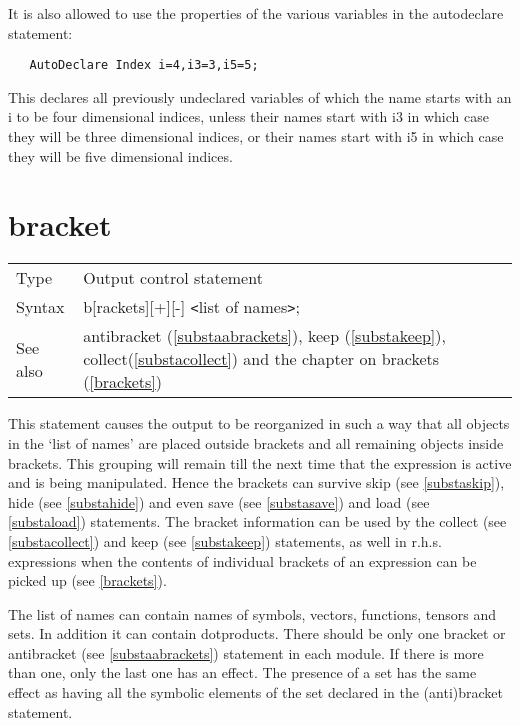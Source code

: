 \noindent It is also allowed to use the properties of the various variables 
in the autodeclare statement:
\begin{verbatim}
   AutoDeclare Index i=4,i3=3,i5=5;
\end{verbatim}
This declares all previously undeclared variables of which the name starts 
with an i to be four dimensional indices, unless their names start with i3 in 
which case they will be three dimensional indices, or their names start 
with i5 in which case they will be five dimensional indices. \vspace{10mm}


\section{bracket}
\label{substabracket}

\noindent \begin{tabular}{ll}
Type & Output control statement\\
Syntax & b[rackets][+][-] {\tt<}list of names{\tt>}; \\
See also & antibracket (\ref{substaabrackets}), keep (\ref{substakeep}),
    collect(\ref{substacollect}) and the chapter on brackets 
     (\ref{brackets})
\end{tabular} \vspace{4mm}

\noindent This statement causes the output to be reorganized in such a way 
that all objects in the `list of names' are placed outside 
brackets and all remaining objects inside 
brackets. This grouping will remain till the next time that 
the expression is active and is being manipulated. Hence the brackets can 
survive skip (see \ref{substaskip}), hide (see \ref{substahide}) and even 
save (see \ref{substasave}) and load (see \ref{substaload}) statements. The 
bracket information can be used by the collect (see \ref{substacollect}) 
and keep (see \ref{substakeep}) statements, as well in r.h.s. expressions 
when the contents of individual brackets of an expression can be picked up 
(see \ref{brackets}). \vspace{4mm}

\noindent The list of names can contain names of symbols, vectors, 
functions, tensors and sets. In addition it can contain dotproducts. There 
should be only one bracket or antibracket (see \ref{substaabrackets}) 
statement in each module. If there is more than one, only the last one has 
an effect. The presence of a set has the same effect as having all the 
symbolic elements of the set declared in the (anti)bracket 
statement.\vspace{4mm}

